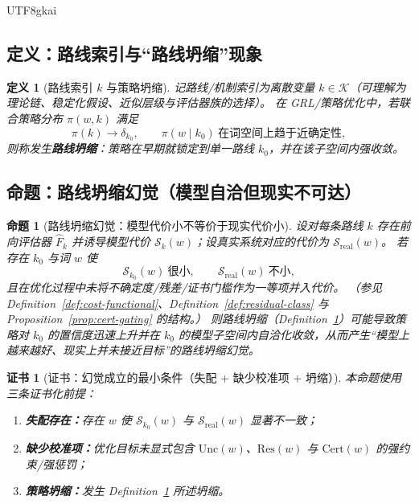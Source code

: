 \documentclass[12pt]{article}
\newtheorem{definition}{定义}[section]
\newtheorem{proposition}{命题}[section]
\newtheorem{certificate}{证书}[section]
\begin{document}
\begin{CJK*}{UTF8}{gkai}
\subsection{定义：路线索引与“路线坍缩”现象}

\begin{definition}[路线索引 $k$ 与策略坍缩]
\label{def:route-collapse}
记路线/机制索引为离散变量 $k\in\mathcal{K}$（可理解为理论链、稳定化假设、近似层级与评估器族的选择）。
在 GRL/策略优化中，若联合策略分布 $\pi(w,k)$ 满足
\[
\pi(k)\to \delta_{k_0},
\qquad
\pi(w\mid k_0)\ \text{在词空间上趋于近确定性},
\]
则称发生\textbf{路线坍缩}：策略在早期就锁定到单一路线 $k_0$，并在该子空间内强收敛。
\end{definition}

\subsection{命题：路线坍缩幻觉（模型自洽但现实不可达）}

\begin{proposition}[路线坍缩幻觉：模型代价小不等价于现实代价小]
\label{prop:route-hallucination}
设对每条路线 $k$ 存在前向评估器 $\widehat{F}_k$ 并诱导模型代价 $\mathcal{S}_k(w)$；设真实系统对应的代价为 $\mathcal{S}_{\mathrm{real}}(w)$。
若存在 $k_0$ 与词 $w$ 使
\[
\mathcal{S}_{k_0}(w)\ \text{很小},\qquad
\mathcal{S}_{\mathrm{real}}(w)\ \text{不小},
\]
且在优化过程中未将不确定度/残差/证书门槛作为一等项并入代价。
（参见 Definition~\ref{def:cost-functional}、Definition~\ref{def:residual-class} 与 Proposition~\ref{prop:cert-gating} 的结构。）
则路线坍缩（Definition~\ref{def:route-collapse}）可能导致策略对 $k_0$ 的置信度迅速上升并在 $k_0$ 的模型子空间内自洽化收敛，从而产生“模型上越来越好、现实上并未接近目标”的路线坍缩幻觉。
\end{proposition}

\begin{certificate}[证书：幻觉成立的最小条件（失配 + 缺少校准项 + 坍缩）]
\label{cert:route-hallucination}
本命题使用三条证书化前提：
\begin{enumerate}
  \item \textbf{失配存在：}存在 $w$ 使 $\mathcal{S}_{k_0}(w)$ 与 $\mathcal{S}_{\mathrm{real}}(w)$ 显著不一致；
  \item \textbf{缺少校准项：}优化目标未显式包含 $\mathrm{Unc}(w)$、$\mathrm{Res}(w)$ 与 $\mathrm{Cert}(w)$ 的强约束/强惩罚；
  \item \textbf{策略坍缩：}发生 Definition~\ref{def:route-collapse} 所述坍缩。
\end{enumerate}
\end{certificate}


\end{CJK*}
\end{document}
